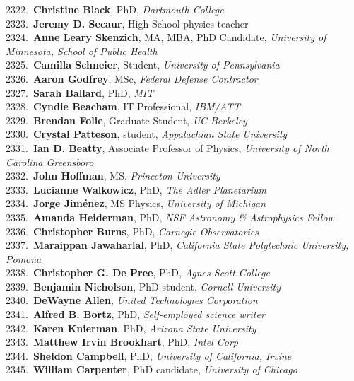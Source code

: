2322.~{\bf Christine Black}, PhD, {\sl Dartmouth College} \\
2323.~{\bf Jeremy D. Secaur}, High School physics teacher \\
2324.~{\bf Anne Leary Skenzich}, MA, MBA, PhD Candidate, {\sl University of Minnesota, School of Public Health} \\
2325.~{\bf Camilla Schneier}, Student, {\sl University of Pennsylvania} \\
2326.~{\bf Aaron Godfrey}, MSc, {\sl Federal Defense Contractor} \\
2327.~{\bf Sarah Ballard}, PhD, {\sl MIT} \\
2328.~{\bf Cyndie Beacham}, IT Professional, {\sl IBM/ATT} \\
2329.~{\bf Brendan Folie}, Graduate Student, {\sl UC Berkeley} \\
2330.~{\bf Crystal Patteson}, student, {\sl Appalachian State University} \\
2331.~{\bf Ian D. Beatty}, Associate Professor of Physics, {\sl University of North Carolina Greensboro } \\
2332.~{\bf John Hoffman}, MS, {\sl Princeton University} \\
2333.~{\bf Lucianne Walkowicz}, PhD, {\sl The Adler Planetarium} \\
2334.~{\bf Jorge Jim\'{e}nez}, MS Physics, {\sl University of Michigan } \\
2335.~{\bf Amanda Heiderman}, PhD, {\sl NSF Astronomy \& Astrophysics Fellow} \\
2336.~{\bf Christopher Burns}, PhD, {\sl Carnegie Observatories} \\
2337.~{\bf Maraippan Jawaharlal}, PhD, {\sl California State Polytechnic University, Pomona} \\
2338.~{\bf Christopher G. De Pree}, PhD, {\sl Agnes Scott College} \\
2339.~{\bf Benjamin Nicholson}, PhD student, {\sl Cornell University} \\
2340.~{\bf DeWayne Allen}, {\sl United Technologies Corporation } \\
2341.~{\bf Alfred B. Bortz}, PhD, {\sl Self-employed science writer} \\
2342.~{\bf Karen Knierman}, PhD, {\sl Arizona State University} \\
2343.~{\bf Matthew Irvin Brookhart}, PhD, {\sl Intel Corp} \\
2344.~{\bf Sheldon Campbell}, PhD, {\sl University of California, Irvine} \\
2345.~{\bf William Carpenter}, PhD candidate, {\sl University of Chicago} \\
